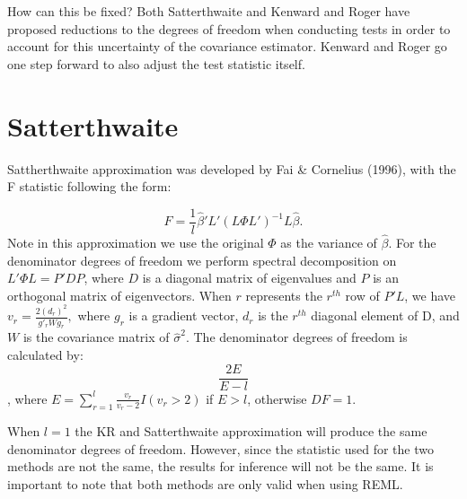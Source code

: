 \documentclass[12pt, twoside]{amherstthesis}
\begin{document}
How can this be fixed? Both Satterthwaite and Kenward and Roger have proposed reductions to the degrees of freedom when conducting tests in order to account for this uncertainty of the covariance estimator. Kenward and Roger go one step forward to also adjust the test statistic itself.

\hypertarget{satterthwaite}{%
\section{Satterthwaite}\label{satterthwaite}}

Sattherthwaite approximation was developed by Fai \& Cornelius (1996), with the F statistic following the form:

\[F = \frac{1}{l}\hat\beta'L'(L\Phi L')^{-1}L\hat\beta.\] Note in this approximation we use the original \(\Phi\) as the variance of \(\hat\beta.\) For the denominator degrees of freedom we perform spectral decomposition on \(L'\Phi L=P'DP\), where \(D\) is a diagonal matrix of eigenvalues and \(P\) is an orthogonal matrix of eigenvectors. When \(r\) represents the \(r^{th}\) row of \(P'L\), we have \(v_r = \frac{2(d_r)^2}{g'_rWg_r},\) where \(g_r\) is a gradient vector, \(d_r\) is the \(r^{th}\) diagonal element of D, and \(W\) is the covariance matrix of \(\hat\sigma^2.\) The denominator degrees of freedom is calculated by:
\[\frac{2E}{E-l}\], where \(E = \sum_{r = 1}^{l} \frac{v_r}{v_r-2}I(v_r>2)\) if \(E >l\), otherwise \(DF = 1.\)

When \(l =1\) the KR and Satterthwaite approximation will produce the same denominator degrees of freedom. However, since the statistic used for the two methods are not the same, the results for inference will not be the same. It is important to note that both methods are only valid when using REML.
\end{document}
